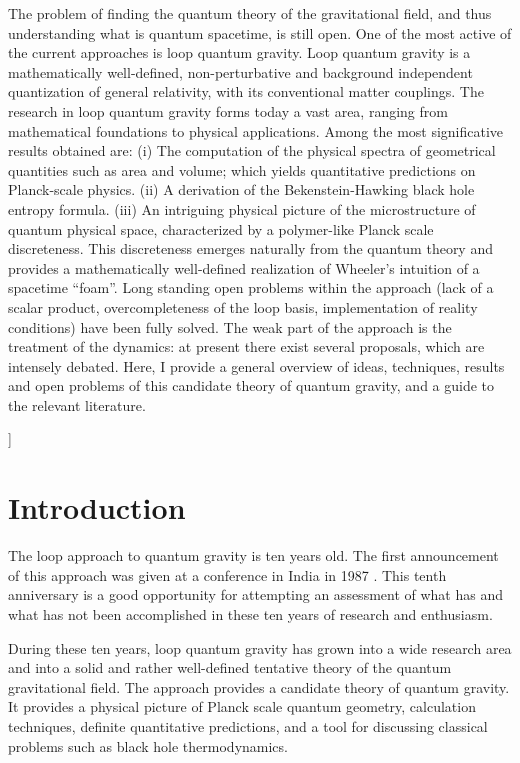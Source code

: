 The problem of finding the quantum theory of the gravitational field, 
and thus understanding what is quantum spacetime, is still open.  One 
of the most active of the current approaches is loop quantum gravity.  
Loop quantum gravity is a mathematically well-defined, 
non-perturbative and background independent quantization of general 
relativity, with its conventional matter couplings.  The research in 
loop quantum gravity forms today a vast area, ranging from 
mathematical foundations to physical applications.  Among the most 
significative results obtained are: (i) The computation of the 
physical spectra of geometrical quantities such as area and volume; 
which yields quantitative predictions on Planck-scale physics.  (ii) A 
derivation of the Bekenstein-Hawking black hole entropy formula.  
(iii) An intriguing physical picture of the microstructure of quantum 
physical space, characterized by a polymer-like Planck scale 
discreteness.  This discreteness emerges naturally from the quantum 
theory and provides a mathematically well-defined realization of 
Wheeler's intuition of a spacetime ``foam''.  Long standing open 
problems within the approach (lack of a scalar product, 
overcompleteness of the loop basis, implementation of reality 
conditions) have been fully solved.  The weak part of the approach is 
the treatment of the dynamics: at present there exist several 
proposals, which are intensely debated.  Here, I provide a general 
overview of ideas, techniques, results and open problems of this 
candidate theory of quantum gravity, and a guide to the relevant 
literature.

\vskip1cm
]

\section{Introduction}

The loop approach to quantum gravity is ten years old.  The first 
announcement of this approach was given at a conference in India in 
1987 \cite{RovelliSmolin87}.  This tenth anniversary is a good 
opportunity for attempting an assessment of what has and what has not 
been accomplished in these ten years of research and enthusiasm.

During these ten years, loop quantum gravity has grown into a wide 
research area and into a solid and rather well-defined tentative 
theory of the quantum gravitational field.  The approach provides a 
candidate theory of quantum gravity.  It provides a physical picture 
of Planck scale quantum geometry, calculation techniques, definite 
quantitative predictions, and a tool for discussing classical problems 
such as black hole thermodynamics.

